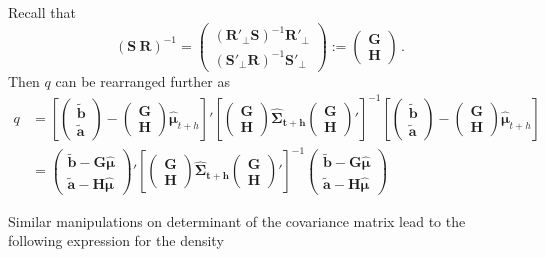 \documentclass[a4paper, 11pt]{article}
\def\PQ{\begin{pmatrix}\bm{G}\\[-0.2cm]\bm{H}\end{pmatrix}}
\def\bt{\begin{pmatrix}\tilde{\bm{b}}\\[-0.2cm]\tilde{\bm{a}}\end{pmatrix}}
\theoremstyle{theo}
\theoremstyle{definition}
\begin{document}
Recall that
$$
(\bm{S} ~ \bm{R})^{-1} =
\begin{pmatrix}(\bm{R}'_\bot \bm{S})^{-1}\bm{R}'_\bot  \\ (\bm{S}'_\bot \bm{R})^{-1}\bm{S}'_\bot \end{pmatrix} :=
\begin{pmatrix}
\bm{G} \\\bm{H}
\end{pmatrix}\,.
$$
Then $q$ can be rearranged further as
\begin{align*}
q& =%
\left[\bt-\PQ\bm{\hat{\mu}}_{t+h}\right]'%
\left[\PQ\bm{\hat{\Sigma}_{t+h}}\PQ'\right]^{-1}\left[\bt-\PQ\bm{\hat{\mu}}_{t+h}\right] %
\\[0.5cm]
 & =%
\begin{pmatrix}\tilde{\bm{b}} - \bm{G}\bm{\hat{\mu}}\\ \tilde{\bm{a}}- \bm{H}\bm{\hat{\mu}}\end{pmatrix}' %
 \left[\PQ\bm{\hat{\Sigma}_{t+h}}\PQ'\right]^{-1}\begin{pmatrix}\tilde{\bm{b}} - \bm{G}\bm{\hat{\mu}}\\ \tilde{\bm{a}}- \bm{H}\bm{\hat{\mu}}\end{pmatrix} %
\end{align*}

Similar manipulations on determinant of the covariance matrix lead to the following expression for the density
\end{document}
